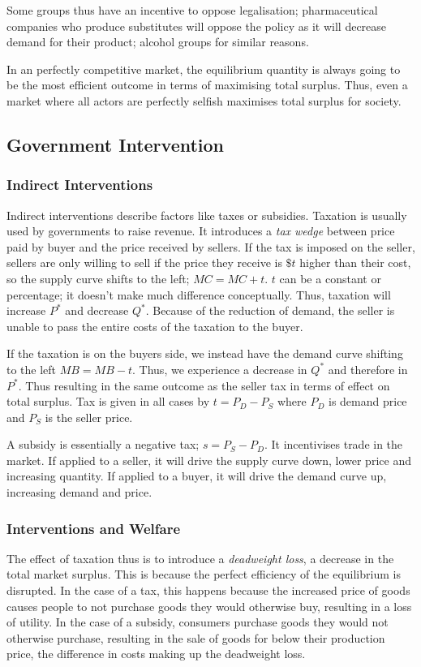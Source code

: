 \documentclass[12pt]{report}
\begin{document}
\bigskip
Some groups thus have an incentive to oppose legalisation; pharmaceutical companies who produce substitutes
will oppose the policy as it will decrease demand for their product; alcohol groups for similar reasons.

\bigskip
In an perfectly competitive market, the equilibrium quantity is always going to be the most efficient
outcome in terms of maximising total surplus. Thus, even a market where all actors are perfectly selfish
maximises total surplus for society.

\subsection*{Government Intervention}
\subsubsection*{Indirect Interventions}
Indirect interventions describe factors like taxes or subsidies. Taxation is usually used by governments to
raise revenue. It introduces a \textit{tax wedge} between price paid by buyer and the price received by sellers.
If the tax is imposed on the seller, sellers are only willing to sell if the price they receive is \(\$t\) higher
than their cost, so the supply curve shifts to the left; \(MC = MC + t\). \(t\) can be a constant or percentage;
it doesn't make much difference conceptually. Thus, taxation will increase \(P^*\) and decrease \(Q^*\). Because of 
the reduction of demand, the seller is unable to pass the entire costs of the taxation to the buyer.

\bigskip
If the taxation is on the buyers side, we instead have the demand curve shifting to the left \(MB = MB - t\). Thus,
we experience a decrease in \(Q^*\) and therefore in \(P^*\). Thus resulting in the same outcome as the seller tax 
in terms of effect on total surplus. Tax is given in all cases by \(t = P_D - P_S\) where \(P_D\) is demand price and 
\(P_S\) is the seller price.

\bigskip
A subsidy is essentially a negative tax; \(s = P_S - P_D\). It incentivises trade in the market. If applied to a
seller, it will drive the supply curve down, lower price and increasing quantity. If applied to a buyer, it will 
drive the demand curve up, increasing demand and price.

\subsubsection*{Interventions and Welfare}
The effect of taxation thus is to introduce a \textit{deadweight loss}, a decrease in the 
total market surplus. This is because the perfect efficiency of the equilibrium is disrupted.
In the case of a tax, this happens because the increased price of goods causes people to
not purchase goods they would otherwise buy, resulting in a loss of utility. In the case of
a subsidy, consumers purchase goods they would not otherwise purchase, resulting in the sale of
goods for below their production price, the difference in costs making up the deadweight loss.
\end{document}
